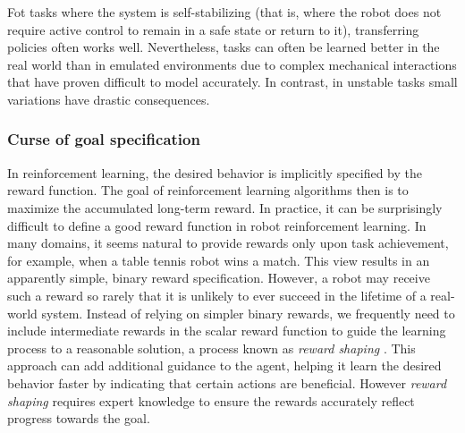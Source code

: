Fot tasks where the system is self-stabilizing (that is, where the robot does not require active control to remain in a safe state or return to it),
transferring policies often works well. Nevertheless, tasks can often be learned better in the real world than in emulated environments due to complex mechanical interactions
that have proven difficult to model accurately. In contrast, in unstable tasks small variations have drastic consequences. %

\subsubsection{Curse of goal specification}
In reinforcement learning, the desired behavior is implicitly specified by the reward function. The goal of reinforcement
learning algorithms then is to maximize the accumulated long-term reward. %
In practice, it can be surprisingly difficult to define a good reward function in robot reinforcement learning. 
In many domains, it seems natural to provide rewards only upon task achievement, for example, when a table tennis
robot wins a match. This view results in an apparently simple, binary reward specification. However, a robot may
receive such a reward so rarely that it is unlikely to ever succeed in the lifetime of a real-world system. Instead of
relying on simpler binary rewards, we frequently need to include intermediate rewards in the scalar reward function
to guide the learning process to a reasonable solution, a process known as \textit{reward shaping} \cite{Laud2004}.
This approach can add additional guidance to the agent, helping it learn the desired behavior faster by indicating that certain actions are beneficial.
However \textit{reward shaping} requires expert knowledge to ensure the rewards accurately reflect progress towards the goal.


